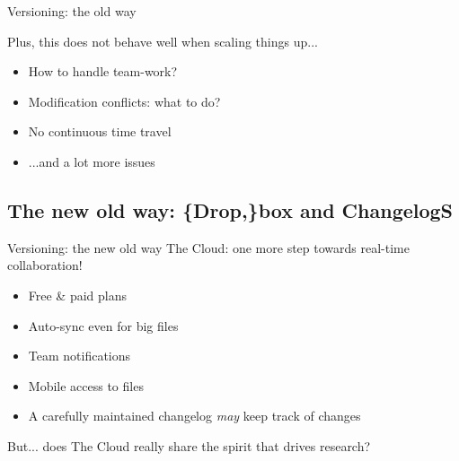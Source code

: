 \documentclass[10pt]{beamer}
\begin{document}
\begin{frame}{Versioning: the old way} %

  Plus, this does not behave well when scaling things up...

  \begin{itemize}
  \item How to handle team-work?
  \item Modification conflicts: what to do?
  \item No continuous time travel
  \item ...and a lot more issues
  \end{itemize}

\end{frame}

\subsection{The new old way: \{Drop,\}box and ChangelogS} %

\begin{frame}{Versioning: the new old way} %
  The Cloud: one more step towards real-time collaboration!

  \begin{itemize}
  \item Free \& paid plans
  \item Auto-sync even for big files
  \item Team notifications
  \item Mobile access to files
  \item A carefully maintained changelog \emph{may} keep track of changes
  \end{itemize}
  \pause

  But...
  \pause
  does The Cloud really share the spirit that drives research?
\end{frame}
\end{document}
